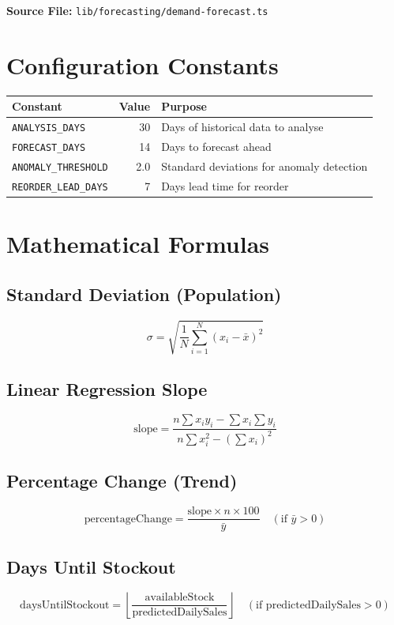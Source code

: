 \documentclass[12pt,a4paper]{report}
\begin{document}
\textbf{Source File:} \texttt{lib/forecasting/demand-forecast.ts}

\section{Configuration Constants}

\begin{center}
\begin{tabular}{lrl}
  \toprule
  \textbf{Constant} & \textbf{Value} & \textbf{Purpose} \\
  \midrule
  \texttt{ANALYSIS\_DAYS}     & 30  & Days of historical data to analyse \\
  \texttt{FORECAST\_DAYS}     & 14  & Days to forecast ahead \\
  \texttt{ANOMALY\_THRESHOLD} & 2.0 & Standard deviations for anomaly detection \\
  \texttt{REORDER\_LEAD\_DAYS}& 7   & Days lead time for reorder \\
  \bottomrule
\end{tabular}
\end{center}

\section{Mathematical Formulas}

\subsection{Standard Deviation (Population)}
\[
  \sigma = \sqrt{\frac{1}{N}\sum_{i=1}^{N}(x_i - \bar{x})^2}
\]

\subsection{Linear Regression Slope}
\[
  \text{slope} = \frac{n \sum x_i y_i - \sum x_i \sum y_i}{n \sum x_i^2 - (\sum x_i)^2}
\]

\subsection{Percentage Change (Trend)}
\[
  \text{percentageChange} = \frac{\text{slope} \times n \times 100}{\bar{y}} \quad (\text{if } \bar{y} > 0)
\]

\subsection{Days Until Stockout}
\[
  \text{daysUntilStockout} = \left\lfloor \frac{\text{availableStock}}{\text{predictedDailySales}} \right\rfloor \quad (\text{if predictedDailySales} > 0)
\]
\end{document}
